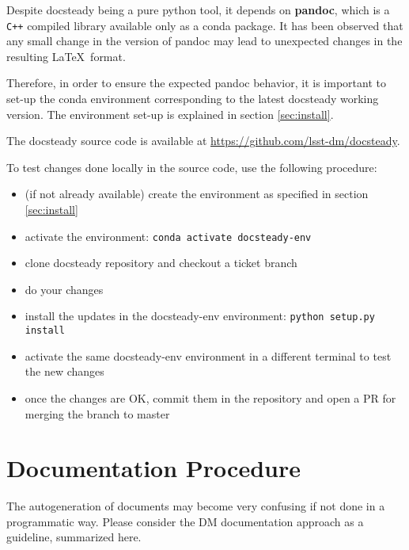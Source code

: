 Despite docsteady being a pure python tool, it depends on \textbf{pandoc}, which is a \texttt{C++} compiled library available only as a conda package.
It has been observed that any small change in the version of pandoc may lead to unexpected changes in the resulting \LaTeX~format.

Therefore, in order to ensure the expected pandoc behavior, it is important to set-up the conda environment corresponding to the latest docsteady working version.
The environment set-up is explained in section \ref{sec:install}.

The docsteady source code is available at \url{https://github.com/lsst-dm/docsteady}.

To test changes done locally in the source code, use the following procedure:

\begin{itemize}
\item (if not already available) create the environment as specified in section \ref{sec:install}
\item activate the environment: \texttt{conda activate docsteady-env}
\item clone docsteady repository and checkout a ticket branch
\item do your changes
\item install the updates in the docsteady-env environment: \texttt{python setup.py install}
\item activate the same docsteady-env environment in a different terminal to test the new changes
\item once the changes are OK, commit them in the repository and open a PR for merging the branch to master
\end{itemize}



\section{Documentation Procedure}
\label{sec:docproc}

The autogeneration of documents may become very confusing if not done in a programmatic way.
Please consider the DM documentation approach as a guideline, summarized here.

